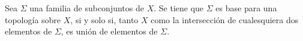 \begin{Prop}\label{Prop:ConjuntoEsBase}
   Sea $\Sigma$ una familia de subconjuntos de $X$. Se tiene que $\Sigma$ es base para una topología sobre $X$, si y solo si, tanto $X$ como la intersección de cualesquiera dos elementos de $\Sigma$, es unión de elementos de $\Sigma$.
\end{Prop}
